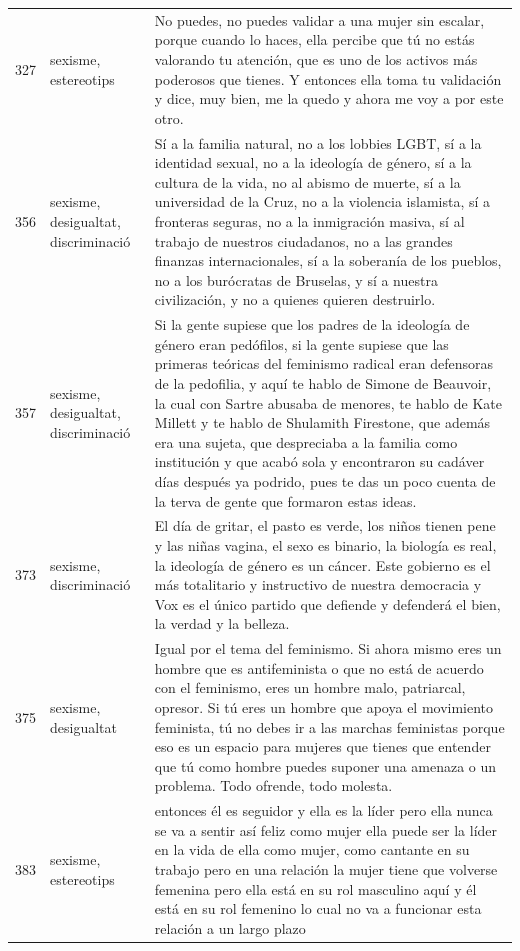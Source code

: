 \begin{longtable}{c>{\raggedright}p{2.0cm}p{12.1cm}}
327 & sexisme, estereotips & No puedes, no puedes validar a una mujer sin escalar, porque cuando lo haces, ella percibe que tú no estás valorando tu atención, que es uno de los activos más poderosos que tienes. Y entonces ella toma tu validación y dice, muy bien, me la quedo y ahora me voy a por este otro. \\
356 & sexisme, desigualtat, discriminació & Sí a la familia natural, no a los lobbies LGBT, sí a la identidad sexual, no a la ideología de género, sí a la cultura de la vida, no al abismo de muerte, sí a la universidad de la Cruz, no a la violencia islamista, sí a fronteras seguras, no a la inmigración masiva, sí al trabajo de nuestros ciudadanos, no a las grandes finanzas internacionales, sí a la soberanía de los pueblos, no a los burócratas de Bruselas, y sí a nuestra civilización, y no a quienes quieren destruirlo. \\
357 & sexisme, desigualtat, discriminació & Si la gente supiese que los padres de la ideología de género eran pedófilos, si la gente supiese que las primeras teóricas del feminismo radical eran defensoras de la pedofilia, y aquí te hablo de Simone de Beauvoir, la cual con Sartre abusaba de menores, te hablo de Kate Millett y te hablo de Shulamith Firestone, que además era una sujeta, que despreciaba a la familia como institución y que acabó sola y encontraron su cadáver días después ya podrido, pues te das un poco cuenta de la terva de gente que formaron estas ideas. \\
373 & sexisme, discriminació & El día de gritar, el pasto es verde, los niños tienen pene y las niñas vagina, el sexo es binario, la biología es real, la ideología de género es un cáncer. Este gobierno es el más totalitario y instructivo de nuestra democracia y Vox es el único partido que defiende y defenderá el bien, la verdad y la belleza. \\
375 & sexisme, desigualtat & Igual por el tema del feminismo. Si ahora mismo eres un hombre que es antifeminista o que no está de acuerdo con el feminismo, eres un hombre malo, patriarcal, opresor. Si tú eres un hombre que apoya el movimiento feminista, tú no debes ir a las marchas feministas porque eso es un espacio para mujeres que tienes que entender que tú como hombre puedes suponer una amenaza o un problema. Todo ofrende, todo molesta. \\
383 & sexisme, estereotips & entonces él es seguidor y ella es la líder pero ella nunca se va a sentir así feliz como mujer ella puede ser la líder en la vida de ella como mujer, como cantante en su trabajo pero en una relación la mujer tiene que volverse femenina pero ella está en su rol masculino aquí y él está en su rol femenino lo cual no va a funcionar esta relación a un largo plazo \\

\end{longtable}
